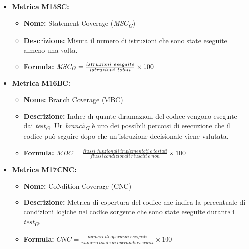 \begin{itemize}
          \item \hypertarget{item:M15SC}{\textbf{Metrica M15SC:}}
          \begin{minipage}[t]{0.9\textwidth}
          \begin{itemize}
              \item \textbf{Nome:} Statement Coverage (\textit{MSC}\textsubscript{\textit{G}})
              \item \textbf{Descrizione:} Misura il numero di istruzioni che sono state eseguite almeno una volta.
              \item \textbf{Formula:} $\textit{MSC}\textsubscript{\textit{G}} = \frac{istruzioni \ eseguite}{istruzioni \ totali} \times 100$
          \end{itemize}
          \end{minipage}

          \item \hypertarget{item:M16BC}{\textbf{Metrica M16BC:}}
          \begin{minipage}[t]{0.9\textwidth}
          \begin{itemize}
              \item \textbf{Nome:} Branch Coverage (MBC)
              \item \textbf{Descrizione:} Indice di quante diramazioni del codice vengono eseguite dai \textit{test}\textsubscript{\textit{G}}. Un \textit{branch}\textsubscript{\textit{G}} è uno dei possibili percorsi di esecuzione che il codice può seguire dopo che un'istruzione decisionale viene valutata.
              \item \textbf{Formula:} $MBC = \frac{flussi \ funzionali \ implementati \ e \ testati}{flussi \ condizionali \ riusciti \ e \ non} \times 100$
          \end{itemize}
        \end{minipage}

          \item \hypertarget{item:M17CNC}{\textbf{Metrica M17CNC:}}
          \begin{minipage}[t]{0.9\textwidth}
          \begin{itemize}
              \item \textbf{Nome:} CoNdition Coverage (CNC)
              \item \textbf{Descrizione:} Metrica di copertura del codice che indica la percentuale di condizioni logiche nel codice sorgente che sono state eseguite durante i \textit{test}\textsubscript{\textit{G}}.
              \item \textbf{Formula:} $CNC = \frac{numero \ di \ operandi \ eseguiti}{numero \ totale \ di \ operandi \ eseguiti} \times 100$
          \end{itemize}
        \end{minipage}
\end{itemize}